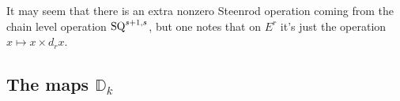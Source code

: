 \documentclass[11pt]{amsart}
\theoremstyle{plain}
\newtheorem{prop}[thm]{Proposition}
\theoremstyle{definition}
\renewcommand{\to}{\longrightarrow}
\theoremstyle{plain}
\newcommand{\Sq}{\mathrm{Sq}}
\begin{document}
It may seem that there is an extra nonzero Steenrod operation coming from the chain level operation $\textup{SQ}^{s+1,s}$, but one notes that on $E^r$ it's just the operation $x\mapsto x\times d_rx$.

\subsection{The maps $\mathbb{D}_k$}
\end{document}
